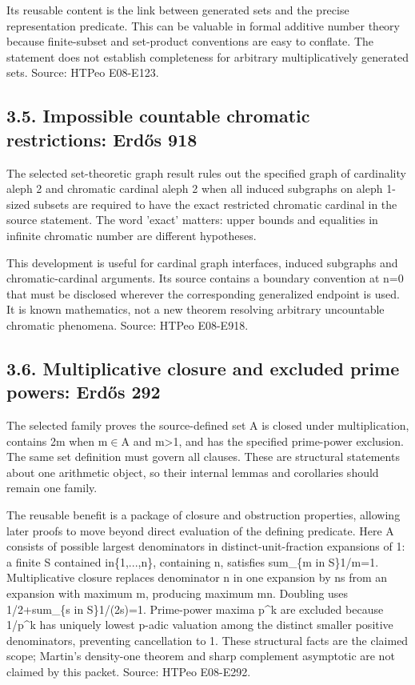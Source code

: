 \documentclass[11pt,a4paper]{article}
\begin{document}
Its reusable content is the link between generated sets and the precise representation predicate. This can be valuable in formal additive number theory because finite-subset and set-product conventions are easy to conflate. The statement does not establish completeness for arbitrary multiplicatively generated sets. Source: HTPeo E08-E123.

\subsection{3.5. Impossible countable chromatic restrictions: Erdős 918}
The selected set-theoretic graph result rules out the specified graph of cardinality aleph 2 and chromatic cardinal aleph 2 when all induced subgraphs on aleph 1-sized subsets are required to have the exact restricted chromatic cardinal in the source statement. The word 'exact' matters: upper bounds and equalities in infinite chromatic number are different hypotheses.

This development is useful for cardinal graph interfaces, induced subgraphs and chromatic-cardinal arguments. Its source contains a boundary convention at n=0 that must be disclosed wherever the corresponding generalized endpoint is used. It is known mathematics, not a new theorem resolving arbitrary uncountable chromatic phenomena. Source: HTPeo E08-E918.

\subsection{3.6. Multiplicative closure and excluded prime powers: Erdős 292}
The selected family proves the source-defined set A is closed under multiplication, contains 2m when m\ensuremath{\in}A and m>1, and has the specified prime-power exclusion. The same set definition must govern all clauses. These are structural statements about one arithmetic object, so their internal lemmas and corollaries should remain one family.

The reusable benefit is a package of closure and obstruction properties, allowing later proofs to move beyond direct evaluation of the defining predicate. Here A consists of possible largest denominators in distinct-unit-fraction expansions of 1: a finite S contained in\{1,...,n\}, containing n, satisfies sum\_\{m in S\}1/m=1. Multiplicative closure replaces denominator n in one expansion by ns from an expansion with maximum m, producing maximum mn. Doubling uses 1/2+sum\_\{s in S\}1/(2s)=1. Prime-power maxima p\textasciicircum{}k are excluded because 1/p\textasciicircum{}k has uniquely lowest p-adic valuation among the distinct smaller positive denominators, preventing cancellation to 1. These structural facts are the claimed scope; Martin's density-one theorem and sharp complement asymptotic are not claimed by this packet. Source: HTPeo E08-E292.
\end{document}
